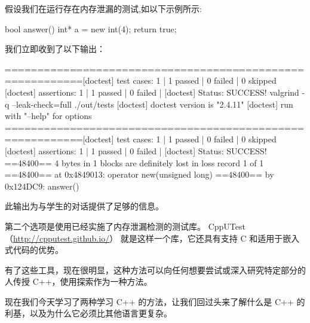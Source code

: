 假设我们在运行存在内存泄漏的测试,如以下示例所示:

\begin{cpp}
bool answer(){
  int* a = new int(4);
  return true;
}
\end{cpp}

我们立即收到了以下输出：

\begin{shell}
==========================================================[doctest]
test cases: 1 | 1 passed | 0 failed | 0 skipped
[doctest] assertions: 1 | 1 passed | 0 failed |
[doctest] Status: SUCCESS!
valgrind -q --leak-check=full ./out/tests
[doctest] doctest version is "2.4.11"
[doctest] run with "--help" for options
==========================================================[doctest]
test cases: 1 | 1 passed | 0 failed | 0 skipped
[doctest] assertions: 1 | 1 passed | 0 failed |
[doctest] Status: SUCCESS!
==48400== 4 bytes in 1 blocks are definitely lost in loss record 1 of 1
==48400== at 0x4849013: operator new(unsigned long) ==48400== by 0x124DC9: answer()
\end{shell}

此输出为与学生的对话提供了足够的信息。

第二个选项是使用已经实施了内存泄漏检测的测试库。 CppUTest （\url{http://cpputest.github.io/}） 就是这样一个库，它还具有支持 C 和适用于嵌入式代码的优势。

有了这些工具，现在很明显，这种方法可以向任何想要尝试或深入研究特定部分的人传授 C++，使用探索作为一种方法。

现在我们今天学习了两种学习 C++ 的方法，让我们回过头来了解什么是 C++ 的利基，以及为什么它必须比其他语言更复杂。














